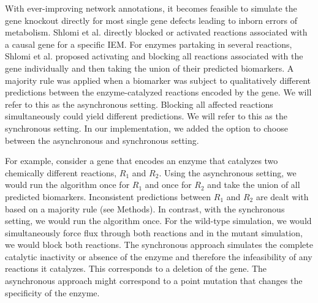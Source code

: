 \documentclass[10pt,a4paper,onecolumn]{article}
\begin{document}
With ever-improving network annotations, it becomes feasible to simulate
the gene knockout directly for most single gene defects leading to
inborn errors of metabolism. Shlomi et al. directly blocked or activated
reactions associated with a causal gene for a specific IEM. For enzymes
partaking in several reactions, Shlomi et al. proposed activating and
blocking all reactions associated with the gene individually and then
taking the union of their predicted biomarkers. A majority rule was
applied when a biomarker was subject to qualitatively different
predictions between the enzyme-catalyzed reactions encoded by the gene.
We will refer to this as the asynchronous setting. Blocking all affected
reactions simultaneously could yield different predictions. We will
refer to this as the synchronous setting. In our implementation, we
added the option to choose between the asynchronous and synchronous
setting.

For example, consider a gene that encodes an enzyme that catalyzes two
chemically different reactions, \(R_1\) and \(R_2\). Using the
asynchronous setting, we would run the algorithm once for \(R_1\) and
once for \(R_2\) and take the union of all predicted biomarkers.
Inconsistent predictions between \(R_1\) and \(R_2\) are dealt with
based on a majority rule (see Methods). In contrast, with the
synchronous setting, we would run the algorithm once. For the wild-type
simulation, we would simultaneously force flux through both reactions
and in the mutant simulation, we would block both reactions. The
synchronous approach simulates the complete catalytic inactivity or
absence of the enzyme and therefore the infeasibility of any reactions
it catalyzes. This corresponds to a deletion of the gene. The
asynchronous approach might correspond to a point mutation that changes
the specificity of the enzyme.
\end{document}
